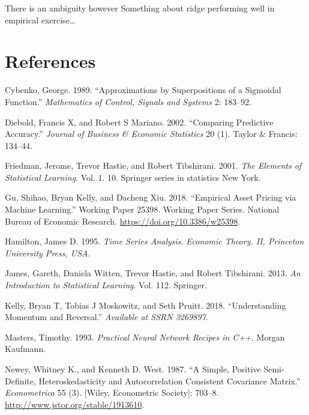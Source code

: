 \documentclass[]{article}
\begin{document}
There is an ambiguity however Something about ridge performing well in
empirical exercise\ldots{}

\hypertarget{references}{%
\section{References}\label{references}}

\hypertarget{refs}{}
\leavevmode\hypertarget{ref-cybenko1989approximations}{}%
Cybenko, George. 1989. ``Approximations by Superpositions of a Sigmoidal
Function.'' \emph{Mathematics of Control, Signals and Systems} 2:
183--92.

\leavevmode\hypertarget{ref-diebold2002comparing}{}%
Diebold, Francis X, and Robert S Mariano. 2002. ``Comparing Predictive
Accuracy.'' \emph{Journal of Business \& Economic Statistics} 20 (1).
Taylor \& Francis: 134--44.

\leavevmode\hypertarget{ref-friedman2001elements}{}%
Friedman, Jerome, Trevor Hastie, and Robert Tibshirani. 2001. \emph{The
Elements of Statistical Learning}. Vol. 1. 10. Springer series in
statistics New York.

\leavevmode\hypertarget{ref-NBERw25398}{}%
Gu, Shihao, Bryan Kelly, and Dacheng Xiu. 2018. ``Empirical Asset
Pricing via Machine Learning.'' Working Paper 25398. Working Paper
Series. National Bureau of Economic Research.
\url{https://doi.org/10.3386/w25398}.

\leavevmode\hypertarget{ref-hamilton1995time}{}%
Hamilton, James D. 1995. \emph{Time Series Analysis}. \emph{Economic
Theory. II, Princeton University Press, USA}.

\leavevmode\hypertarget{ref-james2013introduction}{}%
James, Gareth, Daniela Witten, Trevor Hastie, and Robert Tibshirani.
2013. \emph{An Introduction to Statistical Learning}. Vol. 112.
Springer.

\leavevmode\hypertarget{ref-kelly2018understanding}{}%
Kelly, Bryan T, Tobias J Moskowitz, and Seth Pruitt. 2018.
``Understanding Momentum and Reversal.'' \emph{Available at SSRN
3269897}.

\leavevmode\hypertarget{ref-masters1993practical}{}%
Masters, Timothy. 1993. \emph{Practical Neural Network Recipes in C++}.
Morgan Kaufmann.

\leavevmode\hypertarget{ref-neweywest1987}{}%
Newey, Whitney K., and Kenneth D. West. 1987. ``A Simple, Positive
Semi-Definite, Heteroskedasticity and Autocorrelation Consistent
Covariance Matrix.'' \emph{Econometrica} 55 (3). {[}Wiley, Econometric
Society{]}: 703--8. \url{http://www.jstor.org/stable/1913610}.
\end{document}

